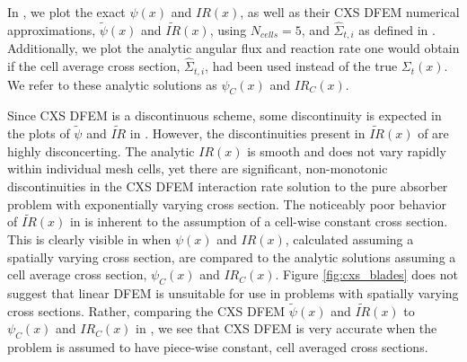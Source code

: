 In , we plot the exact $\psi(x)$ and $IR(x)$, as well as their CXS DFEM numerical approximations, $\widetilde{\psi}(x)$ and $\widetilde{IR}(x)$, using $N_{cells}=5$, and $\hat{\Sigma}_{t,i}$ as defined in . 
Additionally, we plot the analytic angular flux and reaction rate one would obtain if the cell average cross section, $\hat{\Sigma}_{t,i}$, had been used instead of the true $\Sigma_t(x)$.
We refer to these analytic solutions as $\psi_C(x)$ and $IR_C(x)$.

Since CXS DFEM is a discontinuous scheme, some discontinuity is expected in the plots of $\widetilde{\psi}$ and $\widetilde{IR}$ in . 
However, the discontinuities present in $\widetilde{IR}(x)$ of  are highly disconcerting.
The analytic $IR(x)$ is smooth and does not vary rapidly within individual mesh cells, yet there are significant, non-monotonic discontinuities in the CXS DFEM interaction rate solution to the pure absorber problem with exponentially varying cross section.
The noticeably poor behavior of $\widetilde{IR}(x)$ in  is inherent to the assumption of a cell-wise constant cross section.
This is clearly visible in  when $\psi(x)$ and $IR(x)$, calculated assuming a spatially varying cross section, are compared to the analytic solutions assuming a cell average cross section, $\psi_C(x)$ and $IR_C(x)$.  
Figure \ref{fig:cxs_blades} does not suggest that linear DFEM is unsuitable for use in problems with spatially varying cross sections. 
Rather, comparing the CXS DFEM $\widetilde{\psi}(x)$ and $\widetilde{IR}(x)$ to $\psi_C(x)$ and $IR_C(x)$ in , we see that CXS DFEM  is very accurate when the problem is assumed to have piece-wise constant, cell averaged cross sections.

